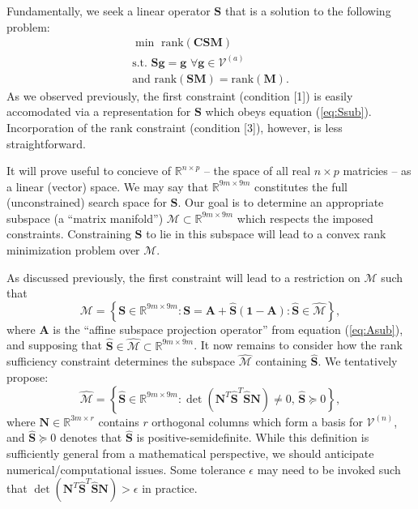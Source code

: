 \documentclass[12pt]{article}
\begin{document}
Fundamentally, we seek a linear operator $\mathbf{S}$ that is a solution to the following problem:
\begin{eqnarray}
	\min \, \, \mbox{rank} ( \mathbf{C} \mathbf{S} \mathbf{M} )  \nonumber \\
	\mbox{s.t.} \, \, \mathbf{S} \mathbf{g} = \mathbf{g} \, \, \forall \mathbf{g} \in \mathcal{V}^{(a)} \\
	\mbox{and} \, \, \mbox{rank} ( \mathbf{S} \mathbf{M} ) = \mbox{rank} ( \mathbf{M} ). \nonumber
\end{eqnarray}
As we observed previously, the first constraint (condition [1]) is easily accomodated via a representation for $\mathbf{S}$ which obeys equation (\ref{eq:Ssub}). Incorporation of the rank constraint (condition [3]), however, is less straightforward.

It will prove useful to concieve of $\mathbb{R}^{n \times p}$ -- the space of all real $n \times p$ matricies -- as a linear (vector) space. We may say that $\mathbb{R}^{9m \times 9m}$ constitutes the full (unconstrained) search space for $\mathbf{S}$. Our goal is to determine an appropriate subspace (a ``matrix manifold'') $\mathcal{M} \subset \mathbb{R}^{9m \times 9m}$ which respects the imposed constraints. Constraining $\mathbf{S}$ to lie in this subspace will lead to a convex rank minimization problem over $\mathcal{M}$.

As discussed previously, the first constraint will lead to a restriction on $\mathcal{M}$ such that
\begin{equation}
	\mathcal{M} = \left\{ \mathbf{S} \in \mathbb{R}^{9m \times 9m} : \mathbf{S} = \mathbf{A} + \hat{\mathbf{S}} ( \mathbf{1} - \mathbf{A} ) : \hat{\mathbf{S}} \in \hat{\mathcal{M}} \right\},
\end{equation}
where $\mathbf{A}$ is the ``affine subspace projection operator'' from equation (\ref{eq:Asub}), and supposing that $\hat{\mathbf{S}} \in \hat{\mathcal{M}} \subset \mathbb{R}^{9m \times 9m}$. It now remains to consider how the rank sufficiency constraint determines the subspace $\hat{\mathcal{M}}$ containing $\hat{\mathbf{S}}$. We tentatively propose:
\begin{equation}
	\hat{\mathcal{M}} = \left\{ \hat{\mathbf{S}} \in \mathbb{R}^{9m \times 9m} : \det ( \mathbf{N}^T \hat{\mathbf{S}}^T \hat{\mathbf{S}} \mathbf{N} ) \neq 0, \, \hat{\mathbf{S}}\succeq 0 \right\},
\end{equation}
where $\mathbf{N} \in \mathbb{R}^{3m \times r}$ contains $r$ orthogonal columns which form a basis for $\mathcal{V}^{(n)}$, and $\hat{\mathbf{S}}\succeq 0$ denotes that $\hat{\mathbf{S}}$ is positive-semidefinite. While this definition is sufficiently general from a mathematical perspective, we should anticipate numerical/computational issues. Some tolerance $\epsilon$ may need to be invoked such that $\det ( \mathbf{N}^T \hat{\mathbf{S}}^T \hat{\mathbf{S}} \mathbf{N} ) > \epsilon$ in practice.
\end{document}
